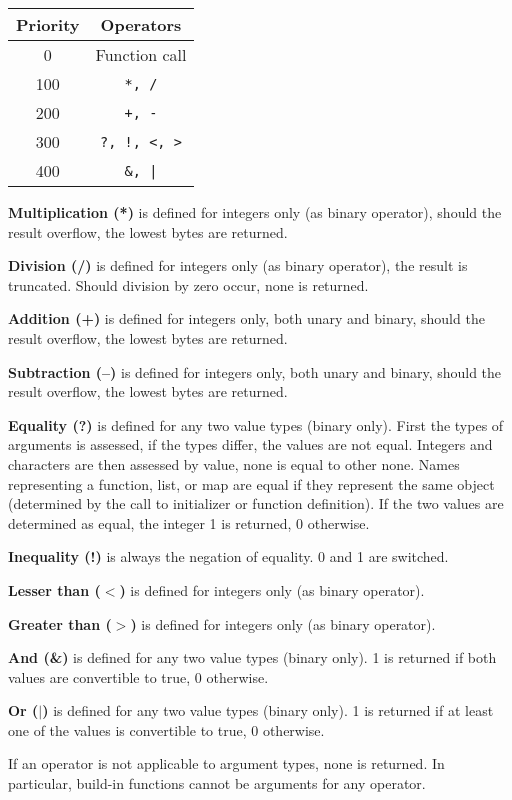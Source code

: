 \documentclass[a4paper,11pt,openany]{article}
\begin{document}
\begin{center}
	\begin{tabular}{cc}
		Priority & Operators \\ \hline
		0 & Function call \\ 
		100 & \texttt{*, /} \\ 
		200 & \texttt{+, -} \\ 
		300 & \texttt{?, !, <, >} \\ 
		400 & \texttt{\&, |}
	\end{tabular}
\end{center}

\textbf{Multiplication (*)} is defined for integers only (as binary operator), should the result overflow, the lowest bytes are returned.

\textbf{Division (/)} is defined for integers only (as binary operator), the result is truncated. Should division by zero occur, none is returned.

\textbf{Addition (+)} is defined for integers only, both unary and binary, should the result overflow, the lowest bytes are returned.

\textbf{Subtraction (--)} is defined for integers only, both unary and binary, should the result overflow, the lowest bytes are returned.

\textbf{Equality (?)} is defined for any two value types (binary only). First the types of arguments is assessed, if the types differ, the values are not equal. Integers and characters are then assessed by value, none is equal to other none. Names representing a function, list, or map are equal if they represent the same object (determined by the call to initializer or function definition). If the two values are determined as equal, the integer 1 is returned, 0 otherwise.

\textbf{Inequality (!)} is always the negation of equality. 0 and 1 are switched.

\textbf{Lesser than ($<$)} is defined for integers only (as binary operator).

\textbf{Greater than ($>$)} is defined for integers only (as binary operator).

\textbf{And (\&)} is defined for any two value types (binary only). 1 is returned if both values are convertible to true, 0 otherwise.

\textbf{Or ($|$)} is defined for any two value types (binary only). 1 is returned if at least one of the values is convertible to true, 0 otherwise.

If an operator is not applicable to argument types, none is returned. In particular, build-in functions cannot be arguments for any operator.
\end{document}
